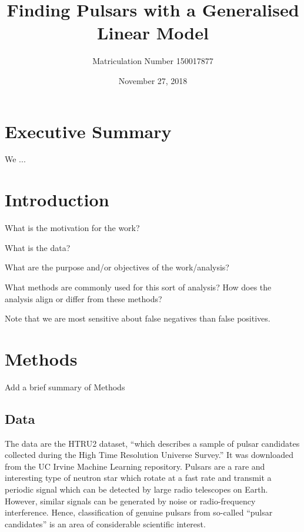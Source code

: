 \documentclass[11pt, oneside]{article}
\title{Finding Pulsars with a Generalised Linear Model}
\author{Matriculation Number 150017877}
\date{November 27, 2018}
\begin{document}
\maketitle


\section{Executive Summary}

We ...

\section{Introduction}

What is the motivation for the work?

What is the data? 

What are the purpose and/or objectives of the work/analysis?

What methods are commonly used for this sort of analysis? How does the analysis align or differ from these methods? 

Note that we are most sensitive about false negatives than false positives. 

\section{Methods}

Add a brief summary of Methods

\subsection{Data}
\label{subsec:data}

The data are the HTRU2 dataset, ``which describes a sample of pulsar candidates collected during the High Time Resolution Universe Survey.'' \cite{data} It was downloaded from the UC Irvine Machine Learning repository.  Pulsars are a rare and interesting type of neutron star which rotate at a fast rate and transmit a periodic signal which can be detected by large radio telescopes on Earth. However, similar signals can be generated by noise or radio-frequency interference. Hence, classification of genuine pulsars from so-called ``pulsar candidates'' is an area of considerable scientific interest.
\end{document}
